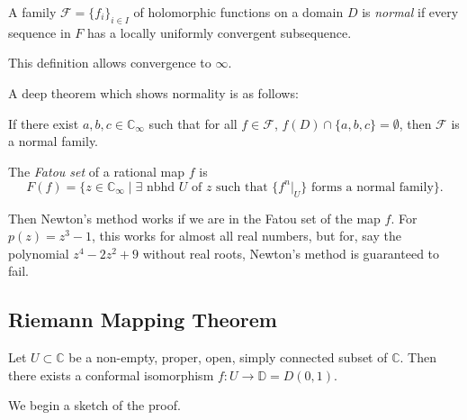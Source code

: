 \documentclass[12pt]{article}
\begin{document}
\begin{definition}
	A family $\mathcal{F} = \{f_i\}_{i \in I}$ of holomorphic functions on a domain $D$ is \emph{normal} if every sequence in $F$ has a locally uniformly convergent subsequence.
\end{definition}

This definition allows convergence to $\infty$.

A deep theorem which shows normality is as follows:

\begin{theorem}
	If there exist $a, b, c \in \mathbb{C}_{\infty}$ such that for all $f \in \mathcal{F}$, $f(D) \cap \{a, b, c\} = \emptyset$, then $\mathcal{F}$ is a normal family.
\end{theorem}

\begin{definition}
	The \emph{Fatou set} of a rational map $f$ is
	\[
		F(f) = \{z \in \mathbb{C}_\infty \mid \exists \text{ nbhd } U \text{ of } z \text{ such that } \{f^{n}|_U\} \text{ forms a normal family}\}.
	\]
\end{definition}

Then Newton's method works if we are in the Fatou set of the map $f$. For $p(z) = z^3-1$, this works for almost all real numbers, but for, say the polynomial $z^{4} - 2z^2 + 9$ without real roots, Newton's method is guaranteed to fail.

\subsection{Riemann Mapping Theorem}
\label{sub:riemann_mapping_theorem}

\begin{theorem}
	Let $U \subset \mathbb{C}$ be a non-empty, proper, open, simply connected subset of $\mathbb{C}$. Then there exists a conformal isomorphism $f : U \to \mathbb{D} =  D(0, 1)$.
\end{theorem}

We begin a sketch of the proof.
\end{document}
